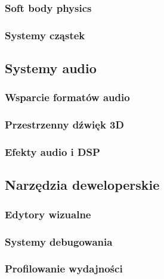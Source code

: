 \subsubsection{Soft body physics}

\subsubsection{Systemy cząstek}

\subsection{Systemy audio}
\subsubsection{Wsparcie formatów audio}

\subsubsection{Przestrzenny dźwięk 3D}

\subsubsection{Efekty audio i DSP}

\subsection{Narzędzia deweloperskie}
\subsubsection{Edytory wizualne}

\subsubsection{Systemy debugowania}

\subsubsection{Profilowanie wydajności}

